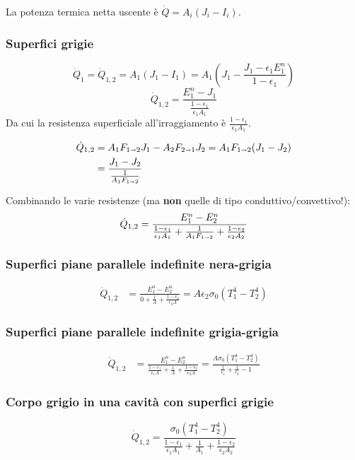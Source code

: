 La potenza termica netta uscente è $\dot{Q} = A_i(J_i-I_i)$.

\subsubsection{Superfici grigie}
\[
    \dot{Q}_1 = \dot{Q}_{1,2} = A_1(J_1-I_1) = A_1\left(J_1-\frac{J_1-\epsilon_1E_1^n}{1-\epsilon_1}\right)
\]
\[
    \dot{Q}_{1,2} = \frac{E_1^n-J_1}{\frac{1-\epsilon_1}{\epsilon_1A_1}}
\]
Da cui la resistenza superficiale all'irraggiamento è $\frac{1-\epsilon_1}{\epsilon_1A_1}$.

\begin{align*}
    \dot{Q}_{1,2} &= A_1F_{1\shortrightarrow 2}J_1 - A_2F_{2\shortrightarrow 1}J_2 = A_1F_{1\shortrightarrow 2}(J_1-J_2) \\
        &= \frac{J_1-J_2}{\frac{1}{A_1F_{1\shortrightarrow 2}}}
\end{align*}

Combinando le varie resistenze (ma \textbf{non} quelle di tipo conduttivo/convettivo!):
\[
    \dot{Q}_{1,2} = \frac{ E_1^n - E_2^n }{ \frac{1-\epsilon_1}{\epsilon_1A_1} + \frac{1}{A_1F_{1\shortrightarrow 2}} + \frac{1-\epsilon_2}{\epsilon_2A_2} }
\]

\subsubsection{Superfici piane parallele indefinite nera-grigia}
\begin{align*}
    \dot{Q}_{1,2} &= \frac{ E_1^n - E_2^n }{ 0 + \frac{1}{A} + \frac{1-\epsilon_2}{\epsilon_2A} } = A\epsilon_2\sigma_0(T_1^4 - T_2^4)
\end{align*}

\subsubsection{Superfici piane parallele indefinite grigia-grigia}
\begin{align*}
    \dot{Q}_{1,2} &= \frac{ E_1^n - E_2^n }{ \frac{1-\epsilon_1}{\epsilon_1A} + \frac{1}{A} + \frac{1-\epsilon_2}{\epsilon_2A} } =
    \frac{A\sigma_0(T_1^4 - T_2^4)}{ \frac{1}{\epsilon_1} + \frac{1}{\epsilon_2} - 1 }
\end{align*}

\subsubsection{Corpo grigio in una cavità con superfici grigie}
\[
    \dot{Q}_{1,2} = \frac{ \sigma_0(T_1^4 - T_2^4) }{ \frac{1-\epsilon_1}{\epsilon_1A_1} + \frac{1}{A_1} + \frac{1-\epsilon_2}{\epsilon_2A_2} }
\]

